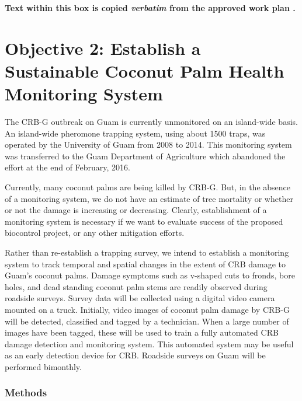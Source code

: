 \documentclass[12pt,letterpaper,english,bibliography=totocnumbered,abstract=on]{scrartcl}
\begin{document}
\newpage
\begin{framed}

\textbf{Text within this box is copied \emph{verbatim} from the approved work plan \cite{mooreWorkPlanAPHISPPA2020}.} 

\section{Objective 2: Establish a Sustainable Coconut Palm Health Monitoring System}

The CRB-G outbreak on Guam is currently unmonitored on an island-wide basis. An island-wide pheromone trapping system, using about 1500 traps, was operated by the University of Guam from 2008 to 2014. This monitoring system was transferred to the Guam Department of Agriculture which abandoned the effort at the end of February, 2016.

Currently, many coconut palms are being killed by CRB-G. But, in the absence of a monitoring system, we do not have an estimate of tree mortality or whether or not the damage is increasing or decreasing. Clearly, establishment of a monitoring system is necessary if we want to evaluate success of the proposed biocontrol project, or any other mitigation efforts.

Rather than re-establish a trapping survey, we intend to establish a monitoring system to track temporal and spatial changes in the extent of CRB damage to Guam's coconut palms. Damage symptoms such as v-shaped cuts to fronds, bore holes, and dead standing coconut palm stems are readily observed during roadside surveys. Survey data will be collected using a digital video camera mounted on a truck. Initially, video images of coconut palm damage by CRB-G will be detected, classified and tagged by a technician. When a large number of images have been tagged, these will be used to train a fully automated CRB damage detection and monitoring system. This automated system may be useful as an early detection device for CRB. Roadside surveys on Guam will be performed bimonthly.

\subsubsection*{Methods}


\end{framed}
\end{document}
